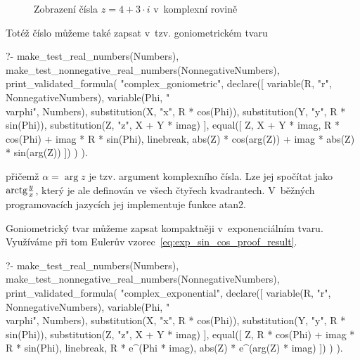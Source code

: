 \begin{figure}[ht]
\begin{center}
\caption{Zobrazení čísla \(z = 4 + 3 \cdot i\) v~komplexní rovině}
\label{img:complex_plane}
\end{center}
\end{figure}

Totéž číslo můžeme také zapsat v~tzv. goniometrickém tvaru

\begin{prolog}
?-	make_test_real_numbers(Numbers),
	make_test_nonnegative_real_numbers(NonnegativeNumbers),
	print_validated_formula(
		"complex_goniometric",
		declare([
			variable(R, "r", NonnegativeNumbers),
			variable(Phi, "\\varphi", Numbers),
			substitution(X, "x", R * cos(Phi)),
			substitution(Y, "y", R * sin(Phi)),
			substitution(Z, "z", X + Y * imag)
		],
			equal([
				Z,
				X + Y * imag,
				R * cos(Phi) + imag * R * sin(Phi),
				linebreak,
				abs(Z) * cos(arg(Z)) + imag * abs(Z) * sin(arg(Z))
			])
		)
	).
\end{prolog}

přičemž \(\alpha = \arg z\) je tzv. argument komplexního čísla. Lze jej spočítat jako \(\mathrm{arctg} \frac{y}{x}\), který je ale definován ve všech čtyřech kvadrantech. V~běžných programovacích jazycích jej implementuje funkce atan2.

Goniometrický tvar můžeme zapsat kompaktněji v~exponenciálním tvaru. Využíváme při tom Eulerův vzorec~\eqref{eq:exp_sin_cos_proof_result}.


\begin{prolog}
?-	make_test_real_numbers(Numbers),
	make_test_nonnegative_real_numbers(NonnegativeNumbers),
	print_validated_formula(
		"complex_exponential",
		declare([
			variable(R, "r", NonnegativeNumbers),
			variable(Phi, "\\varphi", Numbers),
			substitution(X, "x", R * cos(Phi)),
			substitution(Y, "y", R * sin(Phi)),
			substitution(Z, "z", X + Y * imag)
		],
			equal([
				Z,
				R * cos(Phi) + imag * R * sin(Phi),
				linebreak,
				R * e^(Phi * imag),
				abs(Z) * e^(arg(Z) * imag)
			])
		)
	).
\end{prolog}
